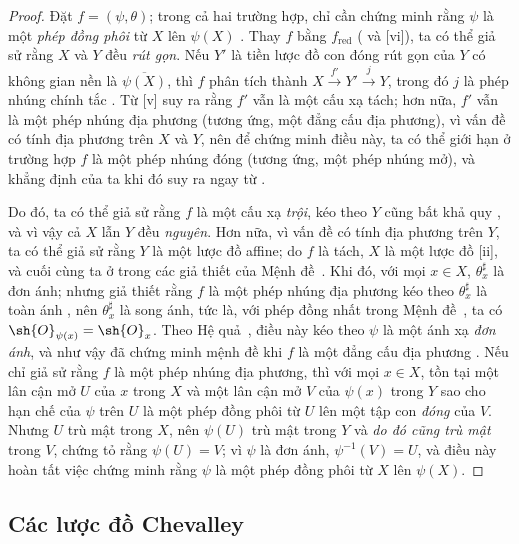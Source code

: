 \documentclass[oneside]{amsart}
\newcommand{\oldpage}[2][]{{\marginnote{\normalfont\textbf{#1}~|~#2}}\ignorespaces}
\let\EGAOriginalLabel\label
\renewcommand{\label}[1]{\phantomsection\EGAOriginalLabel{#1}}
\begin{document}
\begin{proof}
Đặt $f=(\psi,\theta)$;
trong cả hai trường hợp, chỉ cần chứng minh rằng $\psi$ là một \emph{phép đồng phôi} từ $X$ lên $\psi(X)$ .
Thay $f$ bằng $f_\text{red}$ ( và [vi]), ta có thể giả sử rằng $X$ và $Y$ đều \emph{rút gọn}.
Nếu $Y'$ là tiền lược đồ con đóng rút gọn của $Y$ có không gian nền là $\overline{\psi(X)}$, thì $f$ phân tích thành $X\xrightarrow{f'}Y'\xrightarrow{j}Y$, trong đó $j$ là phép nhúng chính tắc .
Từ [v] suy ra rằng $f'$ vẫn là một cấu xạ tách; hơn nữa, $f'$ vẫn là
\oldpage[I]{168}
một phép nhúng địa phương (tương ứng, một đẳng cấu địa phương), vì vấn đề có tính địa phương trên $X$ và $Y$, nên để chứng minh điều này, ta có thể giới hạn ở trường hợp $f$ là một phép nhúng đóng (tương ứng, một phép nhúng mở), và khẳng định của ta khi đó suy ra ngay từ .

Do đó, ta có thể giả sử rằng $f$ là một cấu xạ \emph{trội}, kéo theo $Y$ cũng bất khả quy , và vì vậy cả $X$ lẫn $Y$ đều \emph{nguyên}.
Hơn nữa, vì vấn đề có tính địa phương trên $Y$, ta có thể giả sử rằng $Y$ là một lược đồ affine;
do $f$ là tách, $X$ là một lược đồ [ii], và cuối cùng ta ở trong các giả thiết của Mệnh đề~.
Khi đó, với mọi $x\in X$, $\theta_x^\sharp$ là đơn ánh;
nhưng giả thiết rằng $f$ là một phép nhúng địa phương kéo theo $\theta_x^\sharp$ là toàn ánh , nên $\theta_x^\sharp$ là song ánh, tức là, với phép đồng nhất trong Mệnh đề~, ta có $\sh{O}_{\psi(x)}=\sh{O}_x$.
Theo Hệ quả~, điều này kéo theo $\psi$ là một ánh xạ \emph{đơn ánh}, và như vậy đã chứng minh mệnh đề khi $f$ là một đẳng cấu địa phương .
Nếu chỉ giả sử rằng $f$ là một phép nhúng địa phương, thì với mọi $x\in X$, tồn tại một lân cận mở $U$ của $x$ trong $X$ và một lân cận mở $V$ của $\psi(x)$ trong $Y$ sao cho hạn chế của $\psi$ trên $U$ là một phép đồng phôi từ $U$ lên một tập con \emph{đóng} của $V$.
Nhưng $U$ trù mật trong $X$, nên $\psi(U)$ trù mật trong $Y$ và \emph{do đó cũng trù mật} trong $V$, chứng tỏ rằng $\psi(U)=V$;
vì $\psi$ là đơn ánh, $\psi^{-1}(V)=U$, và điều này hoàn tất việc chứng minh rằng $\psi$ là một phép đồng phôi từ $X$ lên $\psi(X)$.
\end{proof}

\subsection{Các lược đồ Chevalley}
\label{subsection:I.8.3}
\end{document}

